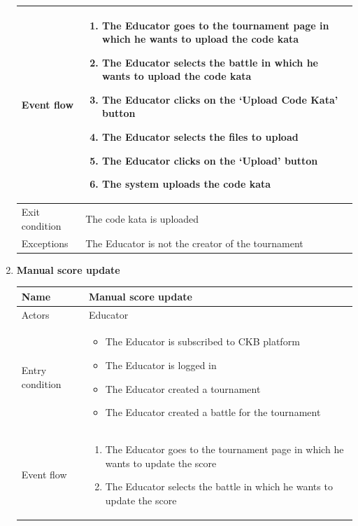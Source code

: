 \begin{enumerate}[label=UC\arabic*:]
\begin{tabular}{|p{3cm}|p{8cm}|}
        \\
        \hline
        Event flow &
        \begin{enumerate}[label=\arabic*.]
            \item The Educator goes to the tournament page in which he wants to upload the code kata
            \item The Educator selects the battle in which he wants to upload the code kata
            \item The Educator clicks on the `Upload Code Kata' button
            \item The Educator selects the files to upload
            \item The Educator clicks on the `Upload' button
            \item The system uploads the code kata
        \end{enumerate}
        \\
        \hline
        Exit condition & The code kata is uploaded \\
        \hline
        Exceptions & The Educator is not the creator of the tournament \\
        \hline
    \end{tabular}
    \item \textbf{Manual score update} \\
    \begin{tabular}{|p{3cm}|p{8cm}|}
        \hline
        Name & Manual score update \\
        \hline
        Actors & Educator \\
        \hline
        Entry condition &   
        \begin{itemize}
            \item The Educator is subscribed to CKB platform
            \item The Educator is logged in
            \item The Educator created a tournament
            \item The Educator created a battle for the tournament
        \end{itemize}
        \\
        \hline
        Event flow &
        \begin{enumerate}[label=\arabic*.]
            \item The Educator goes to the tournament page in which he wants to update the score
            \item The Educator selects the battle in which he wants to update the score

\end{enumerate}
\end{tabular}
\end{enumerate}
